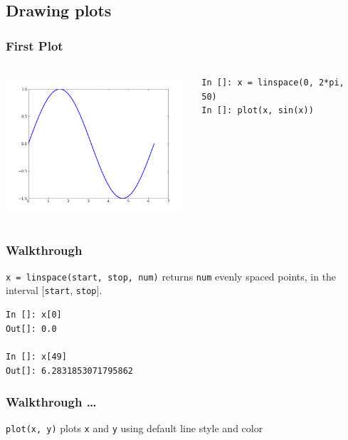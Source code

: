 \documentclass[14pt,compress]{beamer}
\newcommand{\typ}[1]{\lstinline{#1}}
\begin{document}
\subsection{Drawing plots}
\begin{frame}[fragile]
\frametitle{First Plot}
\begin{columns}
    \hspace*{-0.25in}
  \includegraphics[height=2in, interpolate=true]{data/firstplot}
    \begin{block}{}
    \begin{small}
\begin{lstlisting}
In []: x = linspace(0, 2*pi, 50)
In []: plot(x, sin(x))
\end{lstlisting}
    \end{small}
    \end{block}
\end{columns}
\end{frame}

\begin{frame}[fragile]
\frametitle{Walkthrough}
\begin{block}{\typ{x = linspace(start, stop, num)} }
returns \typ{num} evenly spaced points, in the interval [\typ{start}, \typ{stop}].
\end{block}
\vspace*{.35in}
\begin{block}{}
  \small
\begin{lstlisting}
In []: x[0]
Out[]: 0.0

In []: x[49]
Out[]: 6.2831853071795862
\end{lstlisting}
\end{block}
\end{frame}

\begin{frame}[fragile]
\frametitle{Walkthrough \ldots}
\begin{block}{\typ{plot(x, y)}}
plots \typ{x} and \typ{y} using default line style and color
\end{block}
\end{frame}
\end{document}
